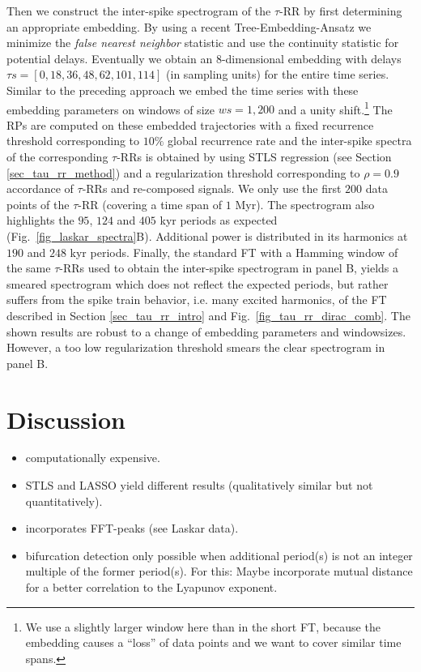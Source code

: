 \documentclass[entropy,article,submit,pdftex,moreauthors]{Definitions/mdpi}
\begin{document}
\noindent Then we construct the inter-spike spectrogram of the $\tau$-RR by first determining an appropriate embedding. By using a recent Tree-Embedding-Ansatz \cite{Kraemer2022} we minimize the 
\textit{false nearest neighbor} statistic \cite{hegger1999} and use the continuity statistic \cite{pecora2007} for potential delays. Eventually we obtain an $8$-dimensional embedding 
with delays $\tau s=[0, 18, 36, 48, 62, 101, 114]$ (in sampling units) for the entire time series. Similar to the preceding approach we embed the time series with these embedding parameters 
on windows of size $ws=1,200$ and a unity shift.\footnote{We use a slightly larger window here than in the short FT, because the embedding causes a ``loss'' of data points and we want to 
cover similar time spans.} The RPs are computed on these embedded trajectories with a fixed recurrence threshold corresponding to $10\%$ global recurrence rate \cite{kraemer2018} 
and the inter-spike spectra of the corresponding $\tau$-RRs is obtained by using STLS regression (see Section \ref{sec_tau_rr_method}) and a regularization threshold corresponding to 
$\rho=0.9$ accordance of $\tau$-RRs and re-composed signals. We only use the first $200$ data points of the $\tau$-RR (covering a time span of $1$ Myr). 
The spectrogram also highlights the $95$, $124$ and $405$ kyr periods as expected (Fig.~\ref{fig_laskar_spectra}B). 
Additional power is distributed in its harmonics at $190$ and $248$ kyr periods. Finally, the standard FT with a Hamming window of the same $\tau$-RRs used to obtain the inter-spike 
spectrogram in panel B, yields a smeared spectrogram which does not reflect the expected periods, but rather suffers from the spike train behavior, i.e. many excited harmonics, of the 
FT described in Section \ref{sec_tau_rr_intro} and Fig.~\ref{fig_tau_rr_dirac_comb}. The shown results are robust to a change of embedding parameters and windowsizes. However, a too low 
regularization threshold smears the clear spectrogram in panel B.


\section{Discussion}\label{sec_tau_rr_discussion}

\begin{itemize}
\item computationally expensive.
\item STLS and LASSO yield different results (qualitatively similar but not quantitatively). 
\item incorporates FFT-peaks (see Laskar data).
\item bifurcation detection only possible when additional period(s) is not an integer multiple of the former period(s). For this: Maybe incorporate mutual distance for a better correlation 
to the Lyapunov exponent. 
\end{itemize}
\end{document}
